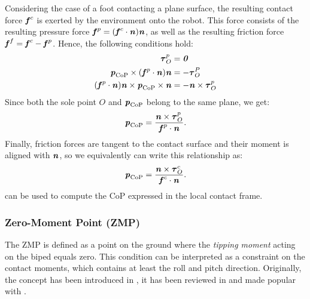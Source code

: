 Considering the case of a foot contacting a plane surface, the resulting contact force $\bm{\mathit{f}}^c$ is exerted by the environment onto the robot. This force consists of the resulting pressure force $\bm{\mathit{f}}^p=(\bm{\mathit{f}}^c\cdot\bm{\mathit{n}})\bm{\mathit{n}}$, as well as the resulting friction force ${\bm{\mathit{f}}^f=\bm{\mathit{f}}^c-\bm{\mathit{f}}^p}$.
Hence, the following conditions hold:
\begin{align*}
\bm{\mathit{\tau}}_O^p 		&= \bm{\mathit{0}} \\
\bm{\mathit{p}}_{\text{CoP}}\times(\bm{\mathit{f}}^p\cdot\bm{\mathit{n}})\bm{\mathit{n}}	&= -\bm{\mathit{\tau}}_O^P \\
(\bm{\mathit{f}}^p\cdot\bm{\mathit{n}})\bm{\mathit{n}}\times\bm{\mathit{p}}_{\text{CoP}}\times\bm{\mathit{n}}	&= -\bm{\mathit{n}}\times\bm{\mathit{\tau}}_O^p
\end{align*}
Since both the sole point $O$ and $\bm{\mathit{p}}_{\text{CoP}}$ belong to the same plane, we get:
\begin{equation*}
\bm{\mathit{p}}_{\text{CoP}}=\dfrac{\bm{\mathit{n}}\times\bm{\mathit{\tau}}_O^p}{\bm{\mathit{f}}^p\cdot\bm{\mathit{n}}}.
\end{equation*}
Finally, friction forces are tangent to the contact surface and their moment is aligned with $\bm{\mathit{n}}$, so we equivalently can write this relationship as:
\begin{equation}\label{eqn:CoPComputation}
\bm{\mathit{p}}_{\text{CoP}}=\dfrac{\bm{\mathit{n}}\times\bm{\mathit{\tau}}_O^c}{\bm{\mathit{f}}^c\cdot\bm{\mathit{n}}}.
\end{equation}
 can be used to compute the \gls{CoP} expressed in the local contact frame.

%
\subsubsection{Zero-Moment Point (ZMP)}
The \gls{ZMP} is defined as a point on the ground where the \textit{tipping moment} acting on the biped equals zero. This condition can be interpreted as a constraint on the contact moments, which contains at least the roll and pitch direction. Originally, the concept has been introduced in \cite{vukobratovic1972stability}, it has been reviewed in \cite{vukobratovic2004zero} and made popular with \cite{kajita2003biped}.

